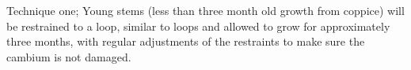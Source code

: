 Technique one; Young stems (less than three month old growth from coppice) will
be restrained to a loop, similar to \cite{jacobs1945l} loops and allowed to
grow for approximately three months, with regular adjustments of the restraints
to make sure the cambium is not damaged.